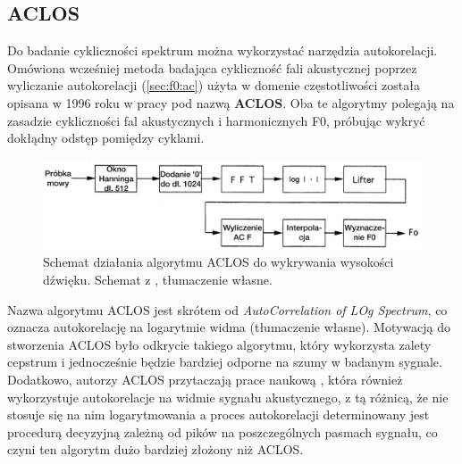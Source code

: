 \documentclass[12pt,a4paper,twoside]{mwart}
\begin{document}
\subsection{ACLOS}\label{sec:f0:aclos}
Do badanie cykliczności spektrum można wykorzystać narzędzia autokorelacji. Omówiona wcześniej metoda badająca cykliczność fali akustycznej poprzez wyliczanie autokorelacji (\ref{sec:f0:ac}) użyta w domenie częstotliwości została opisana w 1996 roku w pracy \cite{Transcription:Kunieda:Aclos} pod nazwą \textbf{ACLOS}. Oba te algorytmy polegają na zasadzie cykliczności fal akustycznych i harmonicznych F0, próbując wykryć dokłądny odstęp pomiędzy cyklami.

\begin{figure}[H]
  \begin{center}
    \includegraphics[scale=0.29]{images/ACLOS/ACLOS_flow.jpg}
    \caption{Schemat działania algorytmu ACLOS do wykrywania wysokości dźwięku. Schemat z 
    \cite[233]{Transcription:Kunieda:Aclos},
    tłumaczenie własne.}
    \label{fig:aclos:flow}
  \end{center}
\end{figure}

Nazwa algorytmu ACLOS jest skrótem od \textit{AutoCorrelation of LOg Spectrum}, co oznacza autokorelację na logarytmie widma (tłumaczenie własne). Motywacją do stworzenia ACLOS było odkrycie takiego algorytmu, który wykorzysta zalety cepstrum i jednocześnie będzie bardziej odporne na szumy w badanym sygnale. Dodatkowo, autorzy ACLOS przytaczają prace naukową \cite{Transcription:Lahat:SpectralAutocorrelationNoiseCorrupted}, która również wykorzystuje autokorelacje na widmie sygnału akustycznego, z tą różnicą, że nie stosuje się na nim logarytmowania a proces autokorelacji determinowany jest procedurą decyzyjną zależną od pików na poszczególnych pasmach sygnału, co czyni ten algorytm dużo bardziej złożony niż ACLOS.
\end{document}
